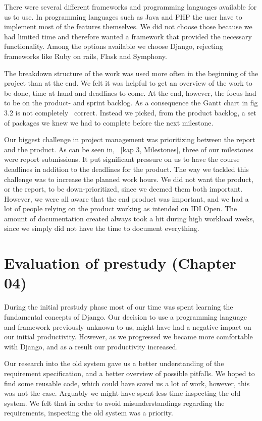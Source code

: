 There were several different frameworks and programming languages
available for us to use. In programming languages such as Java and PHP
the user have to implement most of the features themselves. We did not
choose those because we had limited time and therefore wanted a
framework that provided the necessary functionality. Among the options
available we choose Django, rejecting frameworks like Ruby on rails,
Flask and Symphony. 

The breakdown structure of the work was used more often in the beginning
of the project than at the end. We felt it was helpful to get an
overview of the work to be done, time at hand and deadlines to come. At
the end, however, the focus had to be on the product- and sprint
backlog. As a consequence the Gantt chart in fig 3.2 is not completely
\ correct. Instead we picked, from the product backlog, a set of
packages we knew we had to complete before the next milestone. 

Our biggest challenge in project management was prioritizing between the
report and the product. As can be seen in, \ [kap 3, Milestones], three
of our milestones were report submissions. It put significant pressure
on us to have the course deadlines in addition to the deadlines for the
product. The way we tackled this challenge was to increase the planned
work hours. We did not want the product, or the report, to be
down-prioritized, since we deemed them both important. However, we were
all aware that the end product was important, and we had a lot of
people relying on the product working as intended on IDI Open. The
amount of documentation created always took a hit during high workload
weeks, since we simply did not have the time to document everything.

\section{Evaluation of prestudy (Chapter 04)}

During the initial prestudy phase most of our time was spent learning
the fundamental concepts of Django. Our decision to use a programming
language and framework previously unknown to us, might have had a
negative impact on our initial productivity. However, as we progressed
we became more comfortable with Django, and as a result our
productivity increased.

Our research into the old system gave us a better understanding of the
requirement specification, and a better overview of possible pitfalls.
We hoped to find some reusable code, which could have saved us a lot of
work, however, this was not the case. Arguably we might have spent less
time inspecting the old system. We felt that in order to avoid
misunderstandings regarding the requirements, inspecting the old system
was a priority.

